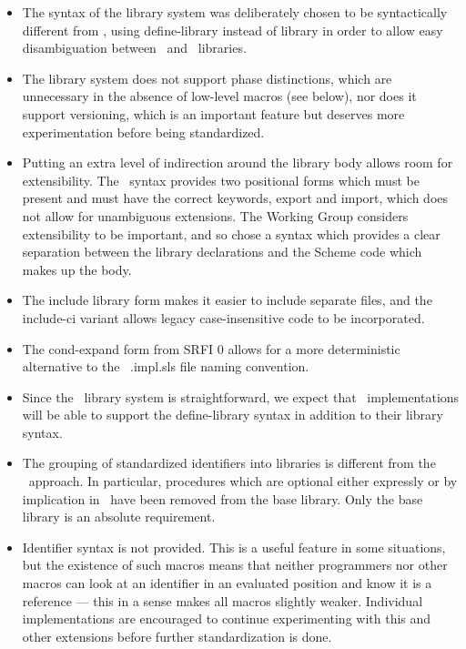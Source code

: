 \begin{itemize}
\item The syntax of the library system was deliberately chosen to be
syntactically different from \rsixrs, using {\cf define-library} instead of
{\cf library} in order to allow easy disambiguation between \rsixrs\
and \rsevenrs\ libraries.

\item The library system does not support phase distinctions, which
are unnecessary in the absence of low-level macros (see below),
nor does it support versioning, which is an important feature but deserves more
experimentation before being standardized.

\item Putting an extra level of indirection around the library body
allows room for extensibility. The \rsixrs\ syntax provides two positional
forms which must be present and must have the correct keywords,
{\cf export} and {\cf import}, which does not allow for unambiguous
extensions. The Working Group considers extensibility to be important,
and so chose a syntax which provides
a clear separation between the library declarations and the Scheme code
which makes up the body.

\item The {\cf include} library form
makes it easier to include separate files, 
and the {\cf include-ci} variant allows legacy 
case-insensitive code to be incorporated.

\item The {\cf cond-expand} form from SRFI 0 allows for a more
deterministic alternative to the \rsixrs\ {\cf .impl.sls} file naming
convention.

\item Since the \rsevenrs\ library system is straightforward, we expect
that \rsixrs\ implementations will be able to support the {\cf define-library}
syntax in addition to their {\cf library} syntax.

\item The grouping of standardized identifiers into libraries is different from the \rsixrs\
approach. In particular, procedures which are optional either expressly
or by implication in \rfivers\ have been removed from the base library.
Only the base library is an absolute requirement.

\item Identifier syntax is not provided. This is a useful feature in
some situations, but the existence of such macros means that neither
programmers nor other macros can look at an identifier in an evaluated
position and know it is a reference --- this in a sense makes all macros
slightly weaker. Individual implementations are encouraged to continue
experimenting with this and other extensions before further standardization is done.


\end{itemize}
